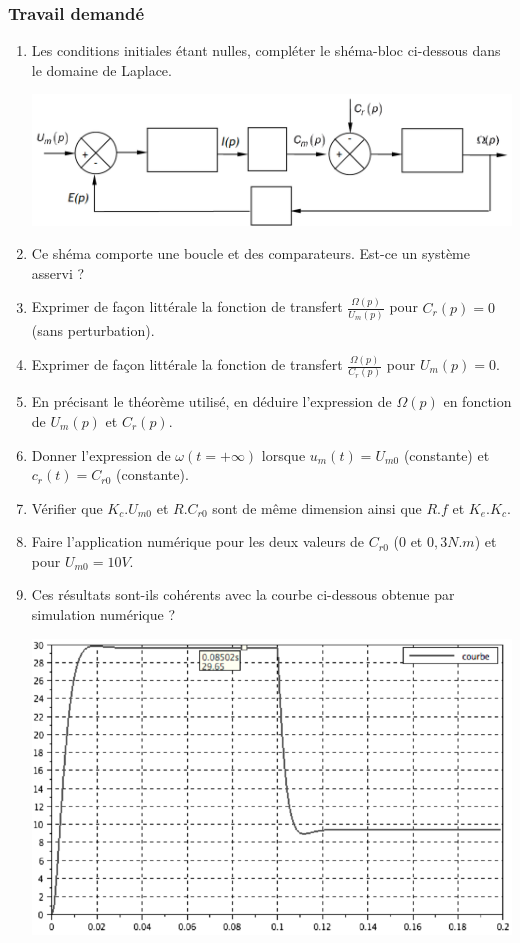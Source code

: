 \subsubsection{Travail demandé}
\begin{enumerate}
\item Les conditions initiales étant nulles, compléter le shéma-bloc ci-dessous dans le domaine de Laplace.
\begin{center}
\includegraphics[scale=0.4]{png/MCC_bloc.png}
\end{center}
\item Ce shéma comporte une boucle et des comparateurs. Est-ce un système asservi ?
\item Exprimer de façon littérale la fonction de transfert $\frac{\Omega(p)}{U_m(p)}$ pour $C_r(p)=0$ (sans perturbation).
\item Exprimer de façon littérale la fonction de transfert $\frac{\Omega(p)}{C_r(p)}$ pour $U_m(p)=0$.
\item En précisant le théorème utilisé, en déduire l'expression de $\Omega(p)$ en fonction de $U_m(p)$ et $C_r(p)$.
\item Donner l'expression de $\omega(t=+\infty)$ lorsque $u_m(t)=U_{m0}$ (constante) et $c_r(t)=C_{r0}$ (constante).
\item Vérifier que $K_c.U_{m0}$ et $R.C_{r0}$ sont de même dimension ainsi que $R.f$ et $K_e.K_c$.
\item Faire l'application numérique pour les deux valeurs de $C_{r0}$ ($0$ et $0,3 N.m$) et pour $U_{m0}=10V$.
\item Ces résultats sont-ils cohérents avec la courbe ci-dessous obtenue par simulation numérique ?
\begin{center}
\includegraphics[scale=0.5]{png/MCC_releves.png}
\end{center}
\end{enumerate}

